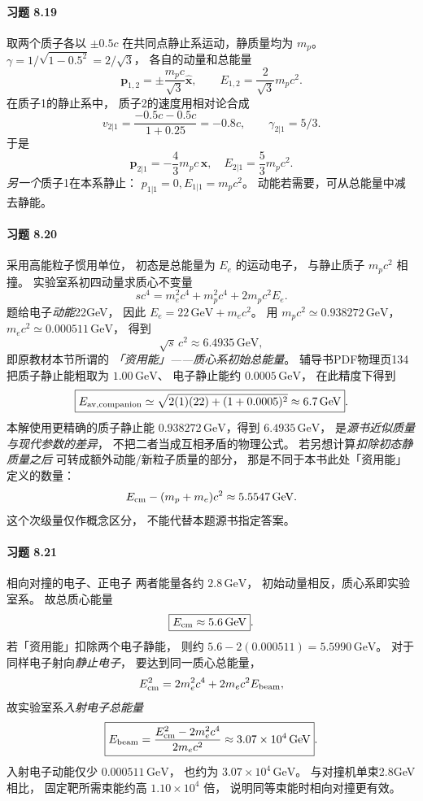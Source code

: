 \paragraph{习题 8.19}
取两个质子各以 \(\pm0.5c\)
在共同点静止系运动，静质量均为 \(m_p\)。
\(\gamma=1/\sqrt{1-0.5^2}=2/\sqrt3\)，
各自的动量和总能量
\[
 \boxed{\boldsymbol p_{1,2}
 =\pm\frac{m_pc}{\sqrt3}\hat{\boldsymbol x}},
 \qquad
 \boxed{E_{1,2}=\frac2{\sqrt3}m_pc^2}.
\]
在质子1的静止系中，
质子2的速度用相对论合成
\[
 v_{2|1}=\frac{-0.5c-0.5c}
 {1+0.25}=-0.8c,\qquad
 \gamma_{2|1}=5/3.
\]
于是
\[
 \boxed{\boldsymbol p_{2|1}=
 -\frac43m_pc\,\hat{\boldsymbol x}},
 \quad
 \boxed{E_{2|1}=\frac53m_pc^2}.
\]
\emph{另一个}质子1在本系静止：
\(p_{1|1}=0,E_{1|1}=m_pc^2\)。
动能若需要，可从总能量中减去静能。

\paragraph{习题 8.20}
采用高能粒子惯用单位，
初态是总能量为 \(E_e\) 的运动电子，
与静止质子 \(m_pc^2\) 相撞。
实验室系初四动量求质心不变量
\[
 s c^4=m_e^2c^4+m_p^2c^4
 +2m_pc^2E_e.
\]
题给电子\emph{动能}22GeV，
因此 \(E_e=22\,\mathrm{GeV}+m_ec^2\)。
用
\(m_pc^2\simeq0.938272\,\mathrm{GeV}\)，
\(m_ec^2\simeq0.000511\,\mathrm{GeV}\)，
得到
\[
 \boxed{\sqrt{s}\,c^2
 \approx6.4935\,\mathrm{GeV}},
\]
即原教材本节所谓的
\emph{「资用能」——质心系初始总能量}。
辅导书PDF物理页134把质子静止能粗取为
\(1.00\,\mathrm{GeV}\)、
电子静止能约 \(0.0005\,\mathrm{GeV}\)，
在此精度下得到
\[
 \boxed{E_{\rm av,companion}
 \simeq\sqrt{2(1)(22)+(1+0.0005)^2}
 \approx6.7\,\mathrm{GeV}}.
\]
本解使用更精确的质子静止能
\(0.938272\,\mathrm{GeV}\)，得到
\(6.4935\,\mathrm{GeV}\)，
是\emph{源书近似质量与现代参数的差异}，
不把二者当成互相矛盾的物理公式。
若另想计算\emph{扣除初态静质量之后}
可转成额外动能/新粒子质量的部分，
那是不同于本书此处「资用能」定义的数量：
\[
 E_{\rm cm}-(m_p+m_e)c^2
 \approx5.5547\,\mathrm{GeV}.
\]
这个次级量仅作概念区分，
不能代替本题源书指定答案。

\paragraph{习题 8.21}
相向对撞的电子、正电子
两者能量各约 \(2.8\,\mathrm{GeV}\)，
初始动量相反，质心系即实验室系。
故总质心能量
\[
 \boxed{E_{\rm cm}\approx5.6\,\mathrm{GeV}}.
\]
若「资用能」扣除两个电子静能，
则约
\(5.6-2(0.000511)=5.5990\,\mathrm{GeV}\)。
对于同样电子射向\emph{静止电子}，
要达到同一质心总能量，
\[
 E_{\rm cm}^2=2m_e^2c^4+2m_ec^2 E_{\rm beam},
\]
故实验室系\emph{入射电子总能量}
\[
 \boxed{E_{\rm beam}=
 \frac{E_{\rm cm}^2-2m_e^2c^4}
 {2m_ec^2}
 \approx3.07\times10^4\,\mathrm{GeV}}.
\]
入射电子动能仅少
\(0.000511\,\mathrm{GeV}\)，
也约为 \(3.07\times10^4\,\mathrm{GeV}\)。
与对撞机单束2.8GeV相比，
固定靶所需束能约高
\(\boxed{1.10\times10^4}\) 倍，
说明同等束能时相向对撞更有效。

